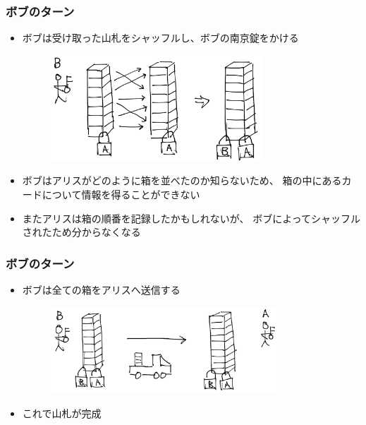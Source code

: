 \begin{frame}
  \frametitle{\showIndex ボブのターン}

  \begin{itemize}
    \item<+-> ボブは受け取った山札をシャッフルし、ボブの南京錠をかける
    \begin{figure}[h]
      \includegraphics[width=0.75\textwidth]{img/shuffle_deck.png}
    \end{figure}

    \item<+-> ボブはアリスがどのように箱を並べたのか知らないため、
    箱の中にあるカードについて情報を得ることができない

    \item<+-> またアリスは箱の順番を記録したかもしれないが、
    ボブによってシャッフルされたため分からなくなる
  \end{itemize}
\end{frame}


\begin{frame}
  \frametitle{\showIndex ボブのターン}

  \begin{itemize}
    \item<+-> ボブは全ての箱をアリスへ送信する
    \begin{figure}[h]
      \includegraphics[width=0.8\textwidth]{img/send_to_a.png}
    \end{figure}

    \item<+-> これで山札が完成
  \end{itemize}
\end{frame}

